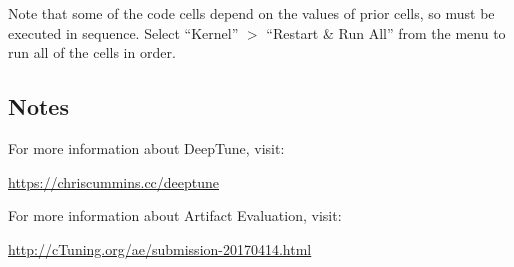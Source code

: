 \noindent Note that some of the code cells depend on the values of prior cells, so must be executed in sequence. Select ``Kernel'' $>$ ``Restart \& Run All'' from the menu to run all of the cells in order.


\subsection{Notes}
\noindent For more information about DeepTune, visit:

\url{https://chriscummins.cc/deeptune}

\noindent For more information about Artifact Evaluation, visit:

\url{http://cTuning.org/ae/submission-20170414.html}

\raggedend
